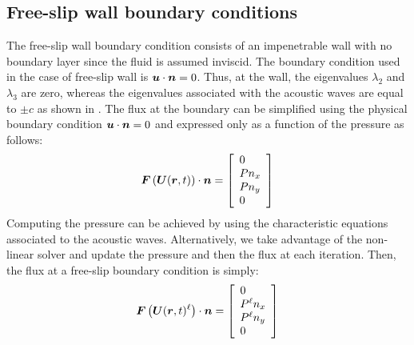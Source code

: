 \subsection{Free-slip wall boundary conditions} \label{sec:wall-bc}
The free-slip wall boundary condition consists of an impenetrable wall with no boundary layer since the fluid is assumed inviscid. The boundary condition used in the case of free-slip wall is $\boldsymbol u \cdot \boldsymbol n = 0$. Thus, at the wall, the eigenvalues $\lambda_2$ and $\lambda_3$ are zero, whereas the eigenvalues associated with the acoustic waves are equal to $\pm c$ as shown in . The flux at the boundary can be simplified using the physical boundary condition $\boldsymbol u \cdot \boldsymbol n = 0$ and expressed only as a function of the pressure as follows:
%
\begin{equation}\label{eq:flux-wall-bc}
\boldsymbol F \left( \boldsymbol U(\boldsymbol r, t) \right) \cdot \boldsymbol n = 
\left[ 
\begin{array}{l}
0\\
P n_x \\
P n_y \\
0
\end{array}
\right]
\end{equation}
%
Computing the pressure can be achieved by using the characteristic equations associated to the acoustic waves. Alternatively, we take advantage of the non-linear solver and update the pressure and then the flux at each iteration. Then, the flux at a free-slip boundary condition is simply:
%
\begin{equation}\label{eq:flux-wall-bc-k}
\boldsymbol F \left( \boldsymbol U(\boldsymbol r, t)^\ell \right) \cdot \boldsymbol n = 
\left[ 
\begin{array}{l}
0\\
P^\ell n_x \\
P^\ell n_y \\
0
\end{array}
\right]
\end{equation}
%

